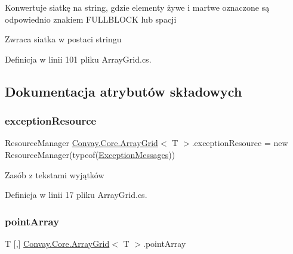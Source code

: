 Konwertuje siatkę na string, gdzie elementy żywe i martwe oznaczone są odpowiednio znakiem F\+U\+L\+L\+B\+L\+O\+CK lub spacji 

\begin{DoxyReturn}{Zwraca}
siatka w postaci stringu
\end{DoxyReturn}


Definicja w linii 101 pliku Array\+Grid.\+cs.



\subsection{Dokumentacja atrybutów składowych}
\hypertarget{class_convay_1_1_core_1_1_array_grid_a5abe9f109182c5fa7754db9c0b1fc58f}{}\label{class_convay_1_1_core_1_1_array_grid_a5abe9f109182c5fa7754db9c0b1fc58f} 
\subsubsection{\texorpdfstring{exception\+Resource}{exceptionResource}}
{\footnotesize\ttfamily Resource\+Manager \hyperlink{class_convay_1_1_core_1_1_array_grid}{Convay.\+Core.\+Array\+Grid}$<$ T $>$.exception\+Resource = new Resource\+Manager(typeof(\hyperlink{class_convay_1_1_core_1_1_exception_messages}{Exception\+Messages}))\hspace{0.3cm}{\ttfamily [protected]}}



Zasób z tekstami wyjątków 



Definicja w linii 17 pliku Array\+Grid.\+cs.

\hypertarget{class_convay_1_1_core_1_1_array_grid_a50b931a7262eb725149b6552d1921af4}{}\label{class_convay_1_1_core_1_1_array_grid_a50b931a7262eb725149b6552d1921af4} 
\subsubsection{\texorpdfstring{point\+Array}{pointArray}}
{\footnotesize\ttfamily T \mbox{[},\mbox{]} \hyperlink{class_convay_1_1_core_1_1_array_grid}{Convay.\+Core.\+Array\+Grid}$<$ T $>$.point\+Array\hspace{0.3cm}{\ttfamily [protected]}}



